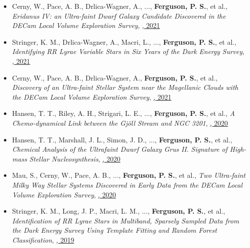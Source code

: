 \begin{itemize}[itemsep=1pt]
    \item {Cerny}, W., {Pace}, A. B., {Drlica-Wagner}, A., ..., \textbf{Ferguson, P. S.}, et al., \textit{{Eridanus IV: an Ultra-faint Dwarf Galaxy Candidate Discovered in the DECam Local Volume Exploration Survey}}, \href{https://ui.adsabs.harvard.edu/abs/2021ApJ...920L..44C}{\textbf{\apjl}, 2021}
    \item {Stringer}, K. M., {Drlica-Wagner}, A., {Macri}, L., ..., \textbf{Ferguson, P. S.}, et al., \textit{{Identifying RR Lyrae Variable Stars in Six Years of the Dark Energy Survey}}, \href{https://ui.adsabs.harvard.edu/abs/2021ApJ...911..109S}{\textbf{\apj}, 2021}
    \item {Cerny}, W., {Pace}, A. B., {Drlica-Wagner}, A., \textbf{Ferguson, P. S.}, et al., \textit{{Discovery of an Ultra-faint Stellar System near the Magellanic Clouds with the DECam Local Volume Exploration Survey}}, \href{https://ui.adsabs.harvard.edu/abs/2021ApJ...910...18C}{\textbf{\apj}, 2021}
    \item {Hansen}, T. T., {Riley}, A. H., {Strigari}, L. E., ..., \textbf{Ferguson, P. S.}, et al., \textit{{A Chemo-dynamical Link between the Gj{\"o}ll Stream and NGC 3201}}, \href{https://ui.adsabs.harvard.edu/abs/2020ApJ...901...23H}{\textbf{\apj}, 2020}
    \item {Hansen}, T. T., {Marshall}, J. L., {Simon}, J. D., ..., \textbf{Ferguson, P. S.}, et al., \textit{{Chemical Analysis of the Ultrafaint Dwarf Galaxy Grus II. Signature of High-mass Stellar Nucleosynthesis}}, \href{https://ui.adsabs.harvard.edu/abs/2020ApJ...897..183H}{\textbf{\apj}, 2020}
    \item {Mau}, S., {Cerny}, W., {Pace}, A. B., ..., \textbf{Ferguson, P. S.}, et al., \textit{{Two Ultra-faint Milky Way Stellar Systems Discovered in Early Data from the DECam Local Volume Exploration Survey}}, \href{https://ui.adsabs.harvard.edu/abs/2020ApJ...890..136M}{\textbf{\apj}, 2020}
    \item {Stringer}, K. M., {Long}, J. P., {Macri}, L. M., ..., \textbf{Ferguson, P. S.}, et al., \textit{{Identification of RR Lyrae Stars in Multiband, Sparsely Sampled Data from the Dark Energy Survey Using Template Fitting and Random Forest Classification}}, \href{https://ui.adsabs.harvard.edu/abs/2019AJ....158...16S}{\textbf{\aj}, 2019}
\end{itemize}
